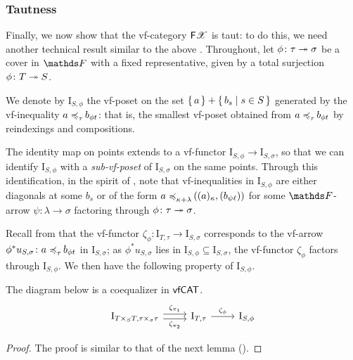 \subsubsection{Tautness}\label{ssec:FX-is-taut} Finally, we now show that the vf-category $\mathsf F \mathscr{X}$ is taut: to do this, we need another technical result similar to the above . Throughout, let $\phi \colon \tau \twoheadrightarrow \sigma$ be a cover in $\FF$ with a fixed representative, given by a total surjection $\phi \colon T \twoheadrightarrow S$.

\begin{cons}\label{cons:walking-phi-reduc}
    We denote by $\mathrm I_{S,\phi}$ the vf-poset on the set $\set{ a } + \set{ b_s | s \in S }$ generated by the vf-inequality $a \mathrel{\preccurlyeq_{{\tau}}^{{}}\mkern-2mu} b_{\phi t}$: that is, the smallest vf-poset obtained from $a \mathrel{\preccurlyeq_{{\tau}}^{{}}\mkern-2mu} b_{\phi t}$ by reindexings and compositions.
\end{cons}

\begin{rmk}\label{rmk:I-S-phi-sub-vf-poset}
    The identity map on points extends to a vf-functor $\mathrm I_{S,\phi} \to \mathrm I_{S,\sigma}$, so that we can identify $\mathrm I_{S,\phi}$ with a \emph{sub-vf-poset} of $\mathrm I_{S,\sigma}$ on the same points. Through this identification, in the spirit of , note that vf-inequalities in $\mathrm I_{S,\phi}$ are either diagonals at some $b_s$ or of the form $a\mathrel{\preccurlyeq_{{\kappa+\lambda}}^{{}}\mkern-2mu}((a)_\kappa,(b_{\psi \ell}))$ for some $\FF$-arrow $\psi\colon \lambda\to\sigma$ factoring through $\phi\colon \tau\twoheadrightarrow\sigma$. 
\end{rmk}

 Recall from  that the vf-functor $\zeta_\phi \colon \mathrm I_{T,\tau} \to \mathrm I_{S,\sigma}$ corresponds to the vf-arrow $\phi^*u_{S,\sigma} \colon a \mathrel{\preccurlyeq_{{\tau}}^{{}}\mkern-2mu} b_{\phi t}$ in $\mathrm I_{S,\sigma}$; as $\phi^*u_{S,\sigma}$ lies in $\mathrm I_{S,\phi}\subseteq \mathrm I_{S,\sigma}$, the vf-functor $\zeta_{\phi}$  factors through $\mathrm I_{S,\phi}$. We then have the following property of $\mathrm I_{S,\phi}$.

\begin{lem}
    The diagram below is a coequalizer in $\mathsf{vfCAT}$.
    \[\begin{tikzcd}
        {\mathrm{I}_{T \times_S T , \tau \times_\sigma \tau}} & {\mathrm I_{T,\tau}} & {\mathrm I_{S,\phi}}
        \arrow["{\zeta_{\pi_1}}", shift left, from=1-1, to=1-2]
        \arrow["{\zeta_{\pi_2}}"', shift right, from=1-1, to=1-2]
        \arrow["{\zeta_{\phi}}", from=1-2, to=1-3]
    \end{tikzcd}\] 
\end{lem}
\begin{proof}
    The proof is similar to that of the next lemma ().
\end{proof}

